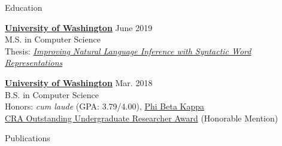 \documentclass{resume}
\begin{document}
\begin{rSection}{Education}

  {\href{https://www.cs.washington.edu/}
    {\bf University of Washington}} \hfill {June 2019} \\
  M.S. in Computer Science \\
  Thesis: \href{https://dericp.github.io/assets/pubs/ms_thesis.pdf}{\emph{Improving Natural Language Inference with Syntactic Word Representations}}

  \vspace{-0.2em}
  {\href{https://www.cs.washington.edu/}
        {\bf University of Washington}} \hfill {Mar. 2018} \\
  B.S. in Computer Science \\
  Honors: \emph{cum laude} (GPA: 3.79/4.00), \href{https://www.pbk.org/web}
    {Phi Beta Kappa} \\
  \href{https://cra.org/about/awards/outstanding-undergraduate-researcher-award/}
       {CRA Outstanding Undergraduate Researcher Award} (Honorable Mention)

\end{rSection}

\begin{rSection}{Publications}
\vspace{1.5em}


\end{rSection}
\end{document}
